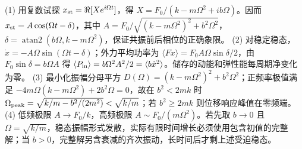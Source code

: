 (1) 用复数试探 \(x_{\rm st}=\Re[X e^{i\Omega t}]\)，得 \(X=F_0/(k-m\Omega^2+i b\Omega)\)。因而 \(x_{\rm st}=A\cos(\Omega t-\delta)\)，其中 \(A=F_0/\sqrt{(k-m\Omega^2)^2+b^2\Omega^2}\)，\(\delta=\operatorname{atan2}(b\Omega,k-m\Omega^2)\)，保证共振前后相位的正确象限。
(2) 对稳定稳态，\(\dot x=-A\Omega\sin(\Omega t-\delta)\)；外力平均功率为 \(\langle F\dot x\rangle=F_0A\Omega\sin\delta/2\)，由 \(F_0\sin\delta=b\Omega A\) 得 \(\langle P_{\rm in}\rangle=b\Omega^2A^2/2=\langle b\dot x^2\rangle\)。储存的动能和弹性能每周期净变化为零。
(3) 最小化振幅分母平方 \(D(\Omega)=(k-m\Omega^2)^2+b^2\Omega^2\)；正频率极值满足 \(-4m\Omega(k-m\Omega^2)+2b^2\Omega=0\)，故在 \(b^2<2mk\) 时 \(\Omega_{\rm peak}=\sqrt{k/m-b^2/(2m^2)}<\sqrt{k/m}\)；若 \(b^2\ge2mk\) 则位移响应峰值在零频端。
(4) 低频极限 \(A\to F_0/k\)，高频极限 \(A\sim F_0/(m\Omega^2)\)。若先取 \(b\to0\) 且 \(\Omega=\sqrt{k/m}\)，稳态振幅形式发散，实际有限时间增长必须使用包含初值的完整解；当 \(b>0\)，完整解另含衰减的齐次振动，长时间后才剩上述受迫稳态。
